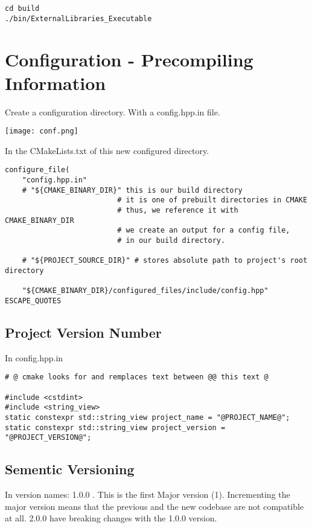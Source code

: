 \documentclass[openany]{report}
\begin{document}
\begin{verbatim}
cd build
./bin/ExternalLibraries_Executable
\end{verbatim}



\section{Configuration - Precompiling Information}

Create a configuration directory. With a config.hpp.in file.

\begin{center}
    \texttt{[image: conf.png]}
\end{center}

In the CMakeLists.txt of this new configured directory.

\begin{verbatim}
configure_file(
    "config.hpp.in"
    # "${CMAKE_BINARY_DIR}" this is our build directory
                          # it is one of prebuilt directories in CMAKE
                          # thus, we reference it with CMAKE_BINARY_DIR
                          # we create an output for a config file, 
                          # in our build directory.

    # "${PROJECT_SOURCE_DIR}" # stores absolute path to project's root directory

    "${CMAKE_BINARY_DIR}/configured_files/include/config.hpp" ESCAPE_QUOTES 
\end{verbatim}

\subsection{Project Version Number}

In config.hpp.in

\begin{verbatim}
# @ cmake looks for and remplaces text between @@ this text @

#include <cstdint>
#include <string_view> 
static constexpr std::string_view project_name = "@PROJECT_NAME@";
static constexpr std::string_view project_version = "@PROJECT_VERSION@";
\end{verbatim}

\subsection{Sementic Versioning}

In version names: 1.0.0 . This is the first Major version (1). Incrementing the major version means
that the previous and the new codebase are not compatible at all. 2.0.0 have breaking changes with the 1.0.0 version.
\end{document}
